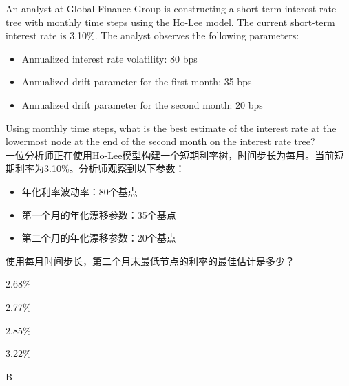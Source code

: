 \documentclass{article}
\newcounter{question} %
\begin{document}
\begin{question}
    An analyst at Global Finance Group is constructing a short-term interest rate tree with monthly time steps using the Ho-Lee model. The current short-term interest rate is 3.10\%. The analyst observes the following parameters:
    \begin{itemize}
        \item Annualized interest rate volatility: 80 bps
        \item Annualized drift parameter for the first month: 35 bps
        \item Annualized drift parameter for the second month: 20 bps
    \end{itemize}

    Using monthly time steps, what is the best estimate of the interest rate at the lowermost node at the end of the second month on the interest rate tree?
    \\一位分析师正在使用Ho-Lee模型构建一个短期利率树，时间步长为每月。当前短期利率为3.10\%。分析师观察到以下参数：
    \begin{itemize}
        \item 年化利率波动率：80个基点
        \item 第一个月的年化漂移参数：35个基点
        \item 第二个月的年化漂移参数：20个基点
    \end{itemize}
    使用每月时间步长，第二个月末最低节点的利率的最佳估计是多少？
\end{question}

\begin{choices}
    \item 2.68\%
    \item 2.77\%
    \item 2.85\%
    \item 3.22\%
\end{choices}

\begin{correctanswer}
    B
\end{correctanswer}
\end{document}
